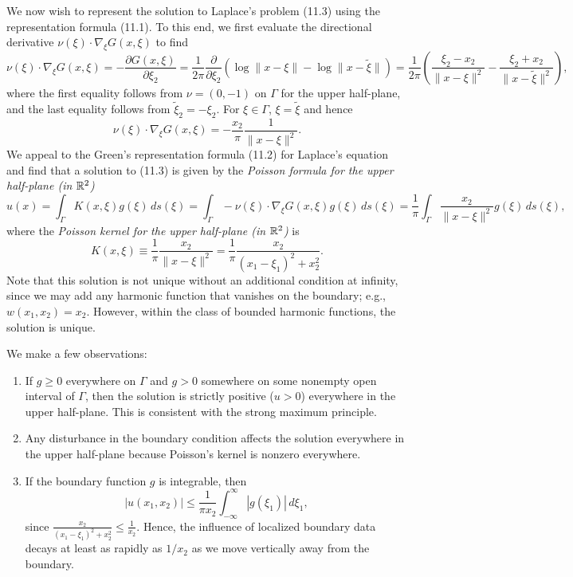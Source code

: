 We now wish to represent the solution to Laplace's problem (11.3) using the representation formula (11.1). To this end, we first evaluate the directional derivative $\nu(\xi) \cdot \nabla_\xi G(x, \xi)$ to find
\[\nu(\xi) \cdot \nabla_\xi G(x, \xi) = -\frac{\partial G(x, \xi)}{\partial\xi_2} = \frac{1}{2\pi}\frac{\partial}{\partial\xi_2}\left(\log\|x - \xi\| - \log\|x - \tilde{\xi}\|\right) = \frac{1}{2\pi}\left(\frac{\xi_2 - x_2}{\|x - \xi\|^2} - \frac{\xi_2 + x_2}{\|x - \tilde{\xi}\|^2}\right),\]
where the first equality follows from $\nu = (0, -1)$ on $\Gamma$ for the upper half-plane, and the last equality follows from $\tilde{\xi}_2 = -\xi_2$. For $\xi \in \Gamma$, $\xi = \tilde{\xi}$ and hence
\[\nu(\xi) \cdot \nabla_\xi G(x, \xi) = -\frac{x_2}{\pi}\frac{1}{\|x - \xi\|^2}.\]
We appeal to the Green's representation formula (11.2) for Laplace's equation and find that a solution to (11.3) is given by the \textit{Poisson formula for the upper half-plane (in $\mathbb{R}^2$)}
\[u(x) = \int_\Gamma K(x, \xi)g(\xi)\,ds(\xi) = \int_\Gamma -\nu(\xi) \cdot \nabla_\xi G(x, \xi)g(\xi)\,ds(\xi) = \frac{1}{\pi}\int_\Gamma \frac{x_2}{\|x - \xi\|^2}g(\xi)\,ds(\xi),\]
where the \textit{Poisson kernel for the upper half-plane (in $\mathbb{R}^2$)} is
\[K(x, \xi) \equiv \frac{1}{\pi}\frac{x_2}{\|x - \xi\|^2} = \frac{1}{\pi}\frac{x_2}{(x_1 - \xi_1)^2 + x_2^2}.\]
Note that this solution is not unique without an additional condition at infinity, since we may add any harmonic function that vanishes on the boundary; e.g., $w(x_1, x_2) = x_2$. However, within the class of bounded harmonic functions, the solution is unique.

We make a few observations:
\begin{enumerate}
    \item If $g \geq 0$ everywhere on $\Gamma$ and $g > 0$ somewhere on some nonempty open interval of $\Gamma$, then the solution is strictly positive ($u > 0$) everywhere in the upper half-plane. This is consistent with the strong maximum principle.
    \item Any disturbance in the boundary condition affects the solution everywhere in the upper half-plane because Poisson's kernel is nonzero everywhere.
    \item If the boundary function $g$ is integrable, then
    \[|u(x_1, x_2)| \leq \frac{1}{\pi x_2}\int_{-\infty}^{\infty} |g(\xi_1)|\,d\xi_1,\]
    since $\frac{x_2}{(x_1 - \xi_1)^2 + x_2^2} \leq \frac{1}{x_2}$. Hence, the influence of localized boundary data decays at least as rapidly as $1/x_2$ as we move vertically away from the boundary.
\end{enumerate}

